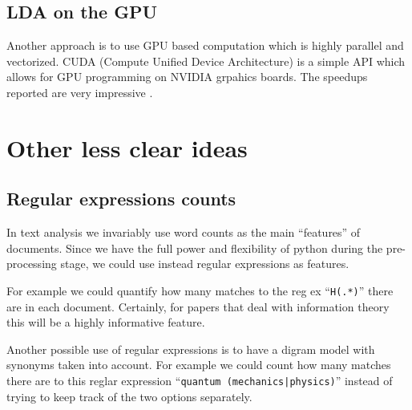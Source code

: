 \documentclass[letterpaper,12pt]{article}
\begin{document}
	\subsection{LDA on the GPU}
		
	        Another approach is to use GPU based computation which is highly parallel and vectorized.
	        CUDA (Compute Unified Device Architecture) is a simple API which allows for GPU programming
	        on NVIDIA grpahics boards. The speedups reported are very impressive
	        \cite{masada2009accelerating, yan-parallel}.




\section{Other less clear ideas}


	\subsection{Regular expressions counts}
        
        In text analysis we invariably use word counts as the main ``features'' of documents.
        Since we have the full power and flexibility of python during the pre-processing stage,
        we could use instead regular expressions as features.

        For example we could quantify how many matches to the reg ex ``\texttt{H(.*)}'' there are
        in each document. Certainly, for papers that deal with information theory this will be 
        a highly informative feature.

        Another possible use of regular expressions is to have a digram model with synonyms
        taken into account. For example we could count how many matches there are to this
        reglar expression ``\texttt{quantum (mechanics|physics)}'' instead of trying to keep
        track of the two options separately.
		
\end{document}
